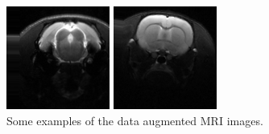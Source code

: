 \begin{figure}[ht]
\begin{minipage}[b]{0.5\linewidth}
  \end{minipage} 
  \begin{minipage}[b]{0.5\linewidth}
    \centering
    \includegraphics[width=\linewidth]{3.png} 
  \end{minipage}
  \hfill
  \begin{minipage}[b]{0.5\linewidth}
    \centering
    \includegraphics[width=\linewidth]{9.png} 
  \end{minipage} 
  \caption{Some examples of the data augmented MRI images. }
  \label{fig:dataAugImage} 
\end{figure}